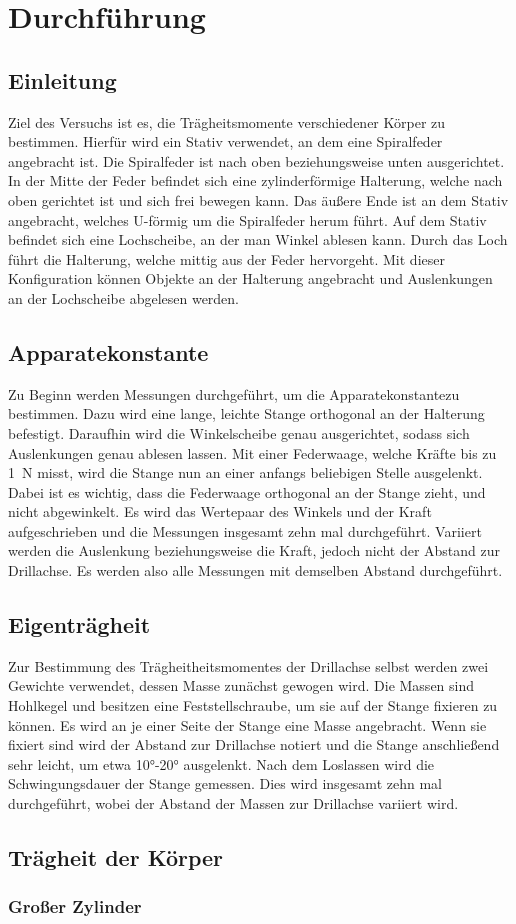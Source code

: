 \section{Durchführung}
\label{sec:Durchführung}

\subsection{Einleitung}
Ziel des Versuchs ist es, die Trägheitsmomente verschiedener Körper zu bestimmen. Hierfür wird ein Stativ verwendet, an dem eine Spiralfeder angebracht ist.
Die Spiralfeder ist nach oben beziehungsweise unten ausgerichtet. In der Mitte der Feder befindet sich eine zylinderförmige Halterung, welche nach oben gerichtet ist und sich frei bewegen kann.
Das äußere Ende ist an dem Stativ angebracht, welches U-förmig um die Spiralfeder herum führt. Auf dem Stativ befindet sich eine Lochscheibe, an der man Winkel ablesen kann.
Durch das Loch führt die Halterung, welche mittig aus der Feder hervorgeht. Mit dieser Konfiguration können Objekte an der Halterung angebracht und Auslenkungen an 
der Lochscheibe abgelesen werden.

\subsection{Apparatekonstante}
Zu Beginn werden Messungen durchgeführt, um die Apparatekonstantezu bestimmen.
Dazu wird eine lange, leichte Stange orthogonal an der Halterung befestigt. Daraufhin wird die Winkelscheibe genau ausgerichtet, sodass sich Auslenkungen genau ablesen lassen.
Mit einer Federwaage, welche Kräfte bis zu \SI{1}{\newton} misst, wird die Stange nun an einer anfangs beliebigen Stelle ausgelenkt. Dabei ist es wichtig, dass die Federwaage
orthogonal an der Stange zieht, und nicht abgewinkelt. Es wird das Wertepaar des Winkels und der Kraft aufgeschrieben und die Messungen insgesamt zehn mal durchgeführt.
Variiert werden die Auslenkung beziehungsweise die Kraft, jedoch nicht der Abstand zur Drillachse. Es werden also alle Messungen mit demselben Abstand durchgeführt.

\subsection{Eigenträgheit}
Zur Bestimmung des Trägheitheitsmomentes der Drillachse selbst werden zwei Gewichte verwendet, dessen Masse zunächst gewogen wird.
Die Massen sind Hohlkegel und besitzen eine Feststellschraube, um sie auf der Stange fixieren zu können.
Es wird an je einer Seite der Stange eine Masse angebracht. Wenn sie fixiert sind wird der Abstand zur Drillachse notiert und die Stange anschließend sehr leicht,
um etwa \ang{10;;}-\ang{20;;} ausgelenkt. Nach dem Loslassen wird die Schwingungsdauer der Stange gemessen.
Dies wird insgesamt zehn mal durchgeführt, wobei der Abstand der Massen zur Drillachse variiert wird.

\subsection{Trägheit der Körper}
\subsubsection{Großer Zylinder}
